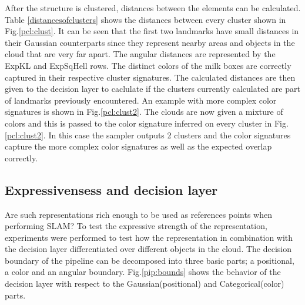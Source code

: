 \documentclass[twoside,hidelinks]{article}
\begin{document}
After the structure is clustered, distances between the elements can be calculated. Table \ref{distancesofclusters} shows the distances between every cluster shown in Fig.\ref{pcl:clust}. It can be seen that the first two landmarks have small distances in their Gaussian counterparts since they represent nearby areas and objects in the cloud that are very far apart. The angular distances are represented by the ExpKL and ExpSqHell rows. The distinct colors of the milk boxes are correctly captured in their respective cluster signatures. The calculated distances are then given to the decision layer to caclulate if the clusters currently calculated are part of landmarks previously encountered.
An example with more complex color signatures is shown in Fig.\ref{pcl:clust2}. The clouds are now given a mixture of colors and this is passed to the color signature inferred on every cluster in Fig.\ref{pcl:clust2}. In this case the sampler outputs 2 clusters and the color signatures capture the more complex color signatures as well as the expected overlap correctly. 

\subsection{Expressivensess and decision layer}

Are such representations rich enough to be used as references points when performing SLAM?
To test the expressive strength of the representation, experiments were performed to test how the representation in combination with the decision layer differentiated over different objects in the cloud. 
The decision boundary of the pipeline can be decomposed into three basic parts; a positional, a color and an angular boundary. Fig.\ref{pip:bounds} shows the behavior of the decision layer with respect to the Gaussian(positional) and Categorical(color) parts. 
    
\end{document}
